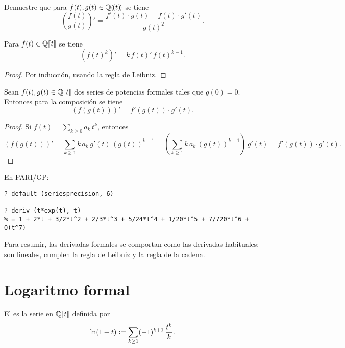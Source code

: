 \documentclass{article}
\begin{document}
\begin{ejercicio*}
Demuestre que para $f(t), g(t) \in \mathbb{Q} (\!(t)\!)$ se tiene
$$\left(\frac{f(t)}{g(t)}\right)' = \frac{f' (t) \cdot g(t) - f (t)\cdot g' (t)}{g (t)^2}.$$
\end{ejercicio*}

\begin{corolario*}
Para $f (t) \in \mathbb{Q} [\![t]\!]$ se tiene
$$(f (t)^k)' = k\,f(t)'\,f(t)^{k-1}.$$

\begin{proof}
Por inducción, usando la regla de Leibniz.
\end{proof}
\end{corolario*}

\begin{observacion*}
\label{regla-de-la-cadena-formal}
Sean $f (t), g (t) \in \mathbb{Q} [\![t]\!]$ dos series de potencias formales tales que $g (0) = 0$. Entonces para la composición se tiene
$$(f (g (t)))' = f' (g (t)) \cdot g' (t).$$

\begin{proof}
Si $f (t) = \sum_{k\ge 0} a_k\,t^k$, entonces
$$(f (g (t)))' = \sum_{k\ge 1} k\,a_k\,g' (t)\, (g (t))^{k-1} = \left( \sum_{k \ge 1} k\,a_k\,(g (t))^{k-1} \right) \, g' (t) = f' (g (t))\cdot g' (t).$$
\end{proof}
\end{observacion*}

\begin{shaded}
\noindent\small En PARI/GP:

\begin{verbatim}
? default (seriesprecision, 6)

? deriv (t*exp(t), t)         
% = 1 + 2*t + 3/2*t^2 + 2/3*t^3 + 5/24*t^4 + 1/20*t^5 + 7/720*t^6 + O(t^7)
\end{verbatim}
\end{shaded}

Para resumir, las derivadas formales se comportan como las derivadas habituales: son lineales, cumplen la regla de Leibniz y la regla de la cadena.


\section*{Logaritmo formal}

\begin{definicion*}
El  es la serie en $\mathbb{Q} [\![t]\!]$ definida por
$$\ln (1 + t) \mathrel{\mathop:}= \sum_{k\ge 1} (-1)^{k+1}\,\frac{t^k}{k}.$$
\end{definicion*}
\end{document}
